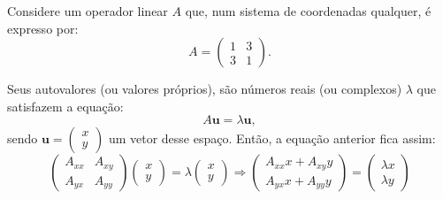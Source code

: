 \documentclass[a4paper,12pt]{article}
\let\vec=\mathbf
\begin{document}
  Considere um operador linear $A$ que, num sistema de coordenadas qualquer, é expresso por:
  \begin{equation*}
  A = \begin{pmatrix}
    1 & 3 \\
    3 & 1
  \end{pmatrix}.
  \end{equation*}
  
  Seus autovalores (ou valores próprios), são números reais (ou complexos) $\lambda$ que satisfazem a equação:
  \begin{equation*}
  A \vec u = \lambda \vec u,
  \end{equation*}
  sendo $\vec u = \begin{pmatrix}x\\y\end{pmatrix}$ um vetor desse espaço.
  Então, a equação anterior fica assim:
  \begin{equation*}
  \begin{pmatrix}
    A_{xx} & A_{xy} \\
    A_{yx} & A_{yy}
  \end{pmatrix}
  \begin{pmatrix}
    x \\
    y
  \end{pmatrix}
  =
  \lambda
  \begin{pmatrix}
    x \\
    y
  \end{pmatrix}
  \Rightarrow
  \begin{pmatrix}
    A_{xx} x + A_{xy} y \\
    A_{yx} x + A_{yy} y
  \end{pmatrix}
  =
  \begin{pmatrix}
    \lambda x \\
    \lambda y
  \end{pmatrix}
  \end{equation*}
\end{document}
